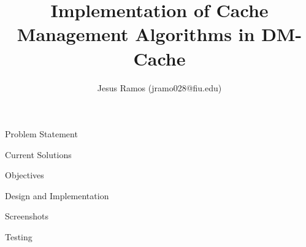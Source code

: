 \documentclass[final]{beamer}
\title{Implementation of Cache Management Algorithms in DM-Cache}
\author{Jesus Ramos (jramo028@fiu.edu)}
\institute[FIU]{Florida International University}
\date{}
\begin{document}
\begin{frame}{}

  \begin{block}{\large Problem Statement}
  \end{block}

  \begin{block}{\large Current Solutions}
  \end{block}

  \begin{block}{\large Objectives}
  \end{block}

  \begin{block}{\large Design and Implementation}
  \end{block}

  \begin{block}{\large Screenshots}
  \end{block}

  \begin{block}{\large Testing}
  \end{block}

\end{frame}
\end{document}

